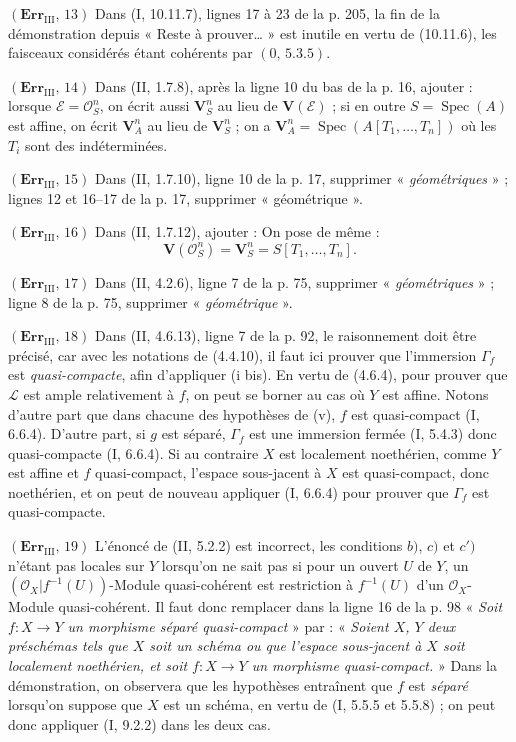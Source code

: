 \noindent\textbf{$(\mathbf{Err}_{\mathrm{III}},\,13)$} Dans (I, 10.11.7),
lignes 17 à 23 de la p. 205, la fin de la démonstration depuis « Reste à
prouver\ldots{} » est inutile en vertu de (10.11.6), les faisceaux considérés
étant cohérents par $(0,\,5.3.5)$.

\noindent\textbf{$(\mathbf{Err}_{\mathrm{III}},\,14)$} Dans (II, 1.7.8),
après la ligne 10 du bas de la p. 16, ajouter : lorsque
$\mathscr E=\mathscr O_S^n$, on écrit aussi $\mathbf V_S^n$ au lieu de
$\mathbf V(\mathscr E)$ ; si en outre $S=\operatorname{Spec}(A)$ est affine,
on écrit $\mathbf V_A^n$ au lieu de $\mathbf V_S^n$ ; on a
$\mathbf V_A^n=\operatorname{Spec}(A[T_1,\ldots,T_n])$ où les $T_i$ sont des
indéterminées.

\noindent\textbf{$(\mathbf{Err}_{\mathrm{III}},\,15)$} Dans (II, 1.7.10),
ligne 10 de la p. 17, supprimer « \emph{géométriques} » ; lignes 12 et 16--17
de la p. 17, supprimer « géométrique ».

\noindent\textbf{$(\mathbf{Err}_{\mathrm{III}},\,16)$} Dans (II, 1.7.12),
ajouter : On pose de même :
\[
  \mathbf V(\mathscr O_S^n)=\mathbf V_S^n=S[T_1,\ldots,T_n].
\]

\noindent\textbf{$(\mathbf{Err}_{\mathrm{III}},\,17)$} Dans (II, 4.2.6),
ligne 7 de la p. 75, supprimer « \emph{géométriques} » ; ligne 8 de la p.
75, supprimer « \emph{géométrique} ».

\noindent\textbf{$(\mathbf{Err}_{\mathrm{III}},\,18)$} Dans (II, 4.6.13),
ligne 7 de la p. 92, le raisonnement doit être précisé, car avec les notations
de (4.4.10), il faut ici prouver que l'immersion $\Gamma_f$ est
\emph{quasi-compacte}, afin d'appliquer (i bis). En vertu de (4.6.4), pour
prouver que $\mathscr L$ est ample relativement à $f$, on peut se borner au
cas où $Y$ est affine. Notons d'autre part que dans chacune des hypothèses de
(v), $f$ est quasi-compact (I, 6.6.4). D'autre part, si $g$ est
séparé, $\Gamma_f$ est une immersion fermée (I, 5.4.3) donc quasi-compacte
(I, 6.6.4). Si au contraire $X$ est localement noethérien, comme $Y$ est affine
et $f$ quasi-compact, l'espace sous-jacent à $X$ est quasi-compact, donc
noethérien, et on peut de nouveau appliquer (I, 6.6.4) pour prouver que
$\Gamma_f$ est quasi-compacte.

\noindent\textbf{$(\mathbf{Err}_{\mathrm{III}},\,19)$} L'énoncé de (II,
5.2.2) est incorrect, les conditions $b)$, $c)$ et $c')$ n'étant pas locales
sur $Y$ lorsqu'on ne sait pas si pour un ouvert $U$ de $Y$, un
$(\mathscr O_X|f^{-1}(U))$-Module quasi-cohérent est restriction à $f^{-1}(U)$
d'un $\mathscr O_X$-Module quasi-cohérent. Il faut donc remplacer dans la ligne
16 de la p. 98 « \emph{Soit $f:X\to Y$ un morphisme séparé quasi-compact} »
par : « \emph{Soient $X$, $Y$ deux préschémas tels que $X$ soit un schéma ou
que l'espace sous-jacent à $X$ soit localement noethérien, et soit
$f:X\to Y$ un morphisme quasi-compact.} » Dans la démonstration, on observera
que les hypothèses entraînent que $f$ est \emph{séparé} lorsqu'on suppose que
$X$ est un schéma, en vertu de (I, 5.5.5 et 5.5.8) ; on peut donc appliquer
(I, 9.2.2) dans les deux cas.

